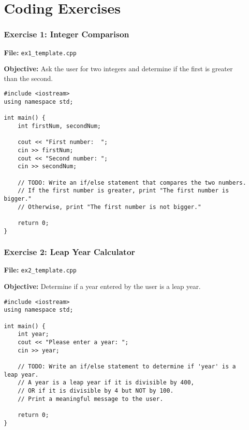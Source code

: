 \documentclass{beamer}
\begin{document}
\section{Coding Exercises}

\begin{frame}[fragile]
\frametitle{Exercise 1: Integer Comparison}
\textbf{File:} \texttt{ex1\_template.cpp}

\textbf{Objective:} Ask the user for two integers and determine if the first is greater than the second.

\begin{verbatim}
#include <iostream>
using namespace std;

int main() {
    int firstNum, secondNum;

    cout << "First number:  ";
    cin >> firstNum;
    cout << "Second number: ";
    cin >> secondNum;

    // TODO: Write an if/else statement that compares the two numbers.
    // If the first number is greater, print "The first number is bigger."
    // Otherwise, print "The first number is not bigger."

    return 0;
}
\end{verbatim}
\end{frame}

\begin{frame}[fragile]
\frametitle{Exercise 2: Leap Year Calculator}
\textbf{File:} \texttt{ex2\_template.cpp}

\textbf{Objective:} Determine if a year entered by the user is a leap year.

\begin{verbatim}
#include <iostream>
using namespace std;

int main() {
    int year;
    cout << "Please enter a year: ";
    cin >> year;

    // TODO: Write an if/else statement to determine if 'year' is a leap year.
    // A year is a leap year if it is divisible by 400,
    // OR if it is divisible by 4 but NOT by 100.
    // Print a meaningful message to the user.

    return 0;
}
\end{verbatim}
\end{frame}
\end{document}
